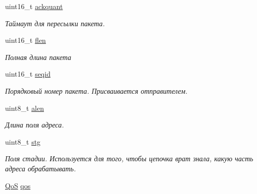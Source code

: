 \begin{DoxyCompactItemize}
\begin{tabbing}
\end{tabbing}\item 
uint16\+\_\+t \hyperlink{structg1_1_1packet__header_a488b4615a401abe54603c84f4a3d4efa}{ackquant}\hypertarget{structg1_1_1packet__header_a488b4615a401abe54603c84f4a3d4efa}{}\label{structg1_1_1packet__header_a488b4615a401abe54603c84f4a3d4efa}

\begin{DoxyCompactList}\small\item\em Таймаут для пересылки пакета. \end{DoxyCompactList}\item 
uint16\+\_\+t \hyperlink{structg1_1_1packet__header_aed8789b03d7fa0c382855e97aaec4dd0}{flen}\hypertarget{structg1_1_1packet__header_aed8789b03d7fa0c382855e97aaec4dd0}{}\label{structg1_1_1packet__header_aed8789b03d7fa0c382855e97aaec4dd0}

\begin{DoxyCompactList}\small\item\em Полная длина пакета \end{DoxyCompactList}\item 
uint16\+\_\+t \hyperlink{structg1_1_1packet__header_a790712eb4ffb25fc506c895b183ca138}{seqid}\hypertarget{structg1_1_1packet__header_a790712eb4ffb25fc506c895b183ca138}{}\label{structg1_1_1packet__header_a790712eb4ffb25fc506c895b183ca138}

\begin{DoxyCompactList}\small\item\em Порядковый номер пакета. Присваивается отправителем. \end{DoxyCompactList}\item 
uint8\+\_\+t \hyperlink{structg1_1_1packet__header_aadecf162728b76d0c72b30c6fe90774f}{alen}\hypertarget{structg1_1_1packet__header_aadecf162728b76d0c72b30c6fe90774f}{}\label{structg1_1_1packet__header_aadecf162728b76d0c72b30c6fe90774f}

\begin{DoxyCompactList}\small\item\em Длина поля адреса. \end{DoxyCompactList}\item 
uint8\+\_\+t \hyperlink{structg1_1_1packet__header_a47c2109902b4ce5d558bbac33e0b626f}{stg}\hypertarget{structg1_1_1packet__header_a47c2109902b4ce5d558bbac33e0b626f}{}\label{structg1_1_1packet__header_a47c2109902b4ce5d558bbac33e0b626f}

\begin{DoxyCompactList}\small\item\em Поля стадии. Используется для того, чтобы цепочка врат знала, какую часть адреса обрабатывать. \end{DoxyCompactList}\item 
\hyperlink{packet_8h_a157fb77f1b8142697dc1b88efaae6a0a}{QoS} \hyperlink{structg1_1_1packet__header_a556522406f886708bb389d14375c79b4}{qos}\hypertarget{structg1_1_1packet__header_a556522406f886708bb389d14375c79b4}{}\label{structg1_1_1packet__header_a556522406f886708bb389d14375c79b4}


\end{DoxyCompactItemize}
